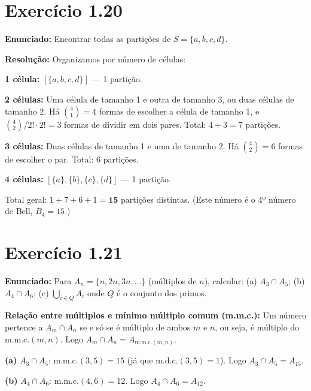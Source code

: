 \documentclass[12pt,a4paper]{article}
\begin{document}
\section*{Exercício 1.20}

\textbf{Enunciado:} Encontrar todas as partições de $S = \{a,b,c,d\}$.

\textbf{Resolução:} Organizamos por número de células:

\textbf{1 célula:} $[\{a,b,c,d\}]$ --- 1 partição.

\textbf{2 células:} Uma célula de tamanho 1 e outra de tamanho 3, ou duas células de tamanho 2. Há $\binom{4}{1} = 4$ formas de escolher a célula de tamanho 1, e $\binom{4}{2}/2! \cdot 2! = 3$ formas de dividir em dois pares. Total: $4 + 3 = 7$ partições.

\textbf{3 células:} Duas células de tamanho 1 e uma de tamanho 2. Há $\binom{4}{2} = 6$ formas de escolher o par. Total: 6 partições.

\textbf{4 células:} $[\{a\},\{b\},\{c\},\{d\}]$ --- 1 partição.

Total geral: $1 + 7 + 6 + 1 = \mathbf{15}$ partições distintas. (Este número é o 4º número de Bell, $B_4 = 15$.)

\section*{Exercício 1.21}

\textbf{Enunciado:} Para $A_n = \{n, 2n, 3n, \ldots\}$ (múltiplos de $n$), calcular: (a) $A_3 \cap A_5$; (b) $A_4 \cap A_6$; (c) $\bigcup_{i \in Q} A_i$ onde $Q$ é o conjunto dos primos.

\begin{teoribox}
\textbf{Relação entre múltiplos e mínimo múltiplo comum (m.m.c.):} Um número pertence a $A_m \cap A_n$ se e só se é múltiplo de ambos $m$ e $n$, ou seja, é múltiplo do m.m.c.$(m,n)$. Logo $A_m \cap A_n = A_{\text{m.m.c.}(m,n)}$.
\end{teoribox}

\textbf{(a)} $A_3 \cap A_5$: m.m.c.$(3,5) = 15$ (já que $\text{m.d.c.}(3,5)=1$). Logo $A_3 \cap A_5 = A_{15}$.

\textbf{(b)} $A_4 \cap A_6$: m.m.c.$(4,6) = 12$. Logo $A_4 \cap A_6 = A_{12}$.
\end{document}
